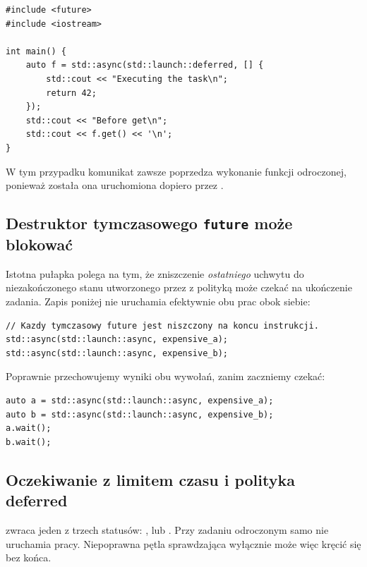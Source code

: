 \begin{lstlisting}[caption={Opóźnione wykonanie: deferred (C++11).}]
#include <future>
#include <iostream>

int main() {
    auto f = std::async(std::launch::deferred, [] {
        std::cout << "Executing the task\n";
        return 42;
    });
    std::cout << "Before get\n";
    std::cout << f.get() << '\n';
}
\end{lstlisting}

W tym przypadku komunikat  zawsze poprzedza wykonanie
funkcji odroczonej, ponieważ została ona uruchomiona dopiero przez .

\subsection{Destruktor tymczasowego \texttt{future} może blokować}

Istotna pułapka polega na tym, że zniszczenie \emph{ostatniego} uchwytu
do niezakończonego stanu utworzonego przez 
z polityką  może czekać na ukończenie zadania.
Zapis poniżej nie uruchamia efektywnie obu prac obok siebie:

\begin{lstlisting}[caption={Pułapka: tymczasowe future; fragment ilustracyjny.}]
// Kazdy tymczasowy future jest niszczony na koncu instrukcji.
std::async(std::launch::async, expensive_a);
std::async(std::launch::async, expensive_b);
\end{lstlisting}

Poprawnie przechowujemy wyniki obu wywołań, zanim zaczniemy czekać:

\begin{lstlisting}[caption={Zadania mogą pracować równolegle; fragment.}]
auto a = std::async(std::launch::async, expensive_a);
auto b = std::async(std::launch::async, expensive_b);
a.wait();
b.wait();
\end{lstlisting}

\subsection{Oczekiwanie z limitem czasu i polityka deferred}

 zwraca jeden z trzech statusów:
,  lub .
Przy zadaniu odroczonym samo  nie uruchamia pracy.
Niepoprawna pętla sprawdzająca wyłącznie 
może więc kręcić się bez końca.

